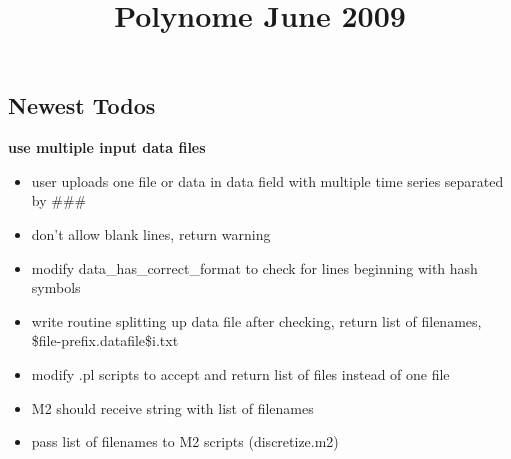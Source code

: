 \documentclass[10pt]{article}
\title{Polynome June 2009}
\begin{document}

\noindent
\subsection*{Newest Todos}
\textbf{use multiple input data files}
\begin{itemize}
    \item user uploads one file or data in data field with multiple time
    series separated by \#\#\#
    \item don't allow blank lines, return warning
    \item modify data\_has\_correct\_format to check for lines beginning with
    hash symbols
    \item write routine splitting up data file after checking, return list of
    filenames, \$file-prefix.datafile\$i.txt
    \item modify .pl scripts to accept and return list of files instead of one
    file
    \item M2 should receive string with list of filenames
    \item pass list of filenames to M2 scripts (discretize.m2)
\end{itemize}
\end{document}
